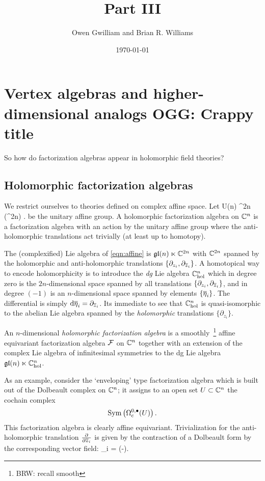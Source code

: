 \documentclass[11pt]{amsart}
\author{Owen Gwilliam and Brian R. Williams}
\date{\today}
\title{Part III}
\def\U{{\rm U}}
\def\brian#1{{\textcolor{blue!65!red}{BRW: {#1}}}}
\def\owen#1{{\textcolor{green!65!black}{OGG: {#1}}}}
\begin{document}
\maketitle

\section{Vertex algebras and higher-dimensional analogs \owen{Crappy title}}

So how do factorization algebras appear in holomorphic field theories?

\subsection{Holomorphic factorization algebras}

We restrict ourselves to theories defined on complex affine space.
Let 
\beqn\label{eqn:affine}
\U(n) \ltimes \RR^{2n} (\RR^{2n}) .
\eeqn
be the unitary affine group. 
A holomorphic factorization algebra on $\CC^n$ is a factorization algebra with an action by the unitary affine group where the anti-holomorphic translations act trivially (at least up to homotopy).

The (complexified) Lie algebra of \eqref{eqn:affine} is $\mathfrak{gl}(n) \ltimes \CC^{2n}$
with $\CC^{2n}$ spanned by the holomorphic and anti-holomorphic translations $\{\partial_{z_i}, \partial_{\zbar_i}\}$. 
A homotopical way to encode holomorphicity is to introduce the {\em dg} Lie algebra $\CC^{n}_{\rm hol}$ which in degree zero is the $2n$-dimensional space spanned by all translations $\{\partial_{z_i}, \partial_{\zbar_i}\}$, and in degree $(-1)$ is an $n$-dimensional space spanned by elements $\{\Bar{\eta}_i\}$. 
The differential is simply $\d \Bar{\eta}_i = \partial_{\zbar_i}$. 
Its immediate to see that $\CC^n_{\rm hol}$ is quasi-isomorphic to the abelian Lie algebra spanned by the {\em holomorphic} translations $\{\partial_{z_i}\}$. 

\begin{dfn}
An $n$-dimensional {\em holomorphic factorization algebra} is a smoothly~\footnote{\brian{recall smooth}} affine equivariant factorization algebra $\cF$ on $\CC^n$ together with an extension of the complex Lie algebra of infinitesimal symmetries
to the dg Lie algebra $
\mathfrak{gl}(n) \ltimes \CC^{n}_{\rm hol}$. 
\end{dfn}

As an example, consider the `enveloping' type factorization algebra which is built out of the Dolbeault complex on $\CC^n$; it assigns to an open set $U \subset \CC^n$ the cochain complex
\[
{\rm Sym} \left(\Omega^{0,\bu}_c(U)\right) .
\]
This factorization algebra is clearly affine equivariant. 
Trivialization for the anti-holomorphic translation $\frac{\partial}{\partial \zbar_i}$ is given by the contraction of a Dolbeault form by the corresponding vector field:
\beqn\label{eqn:triv}
\Bar{\eta}_i =  \vee (-).
\eeqn
\end{document}
